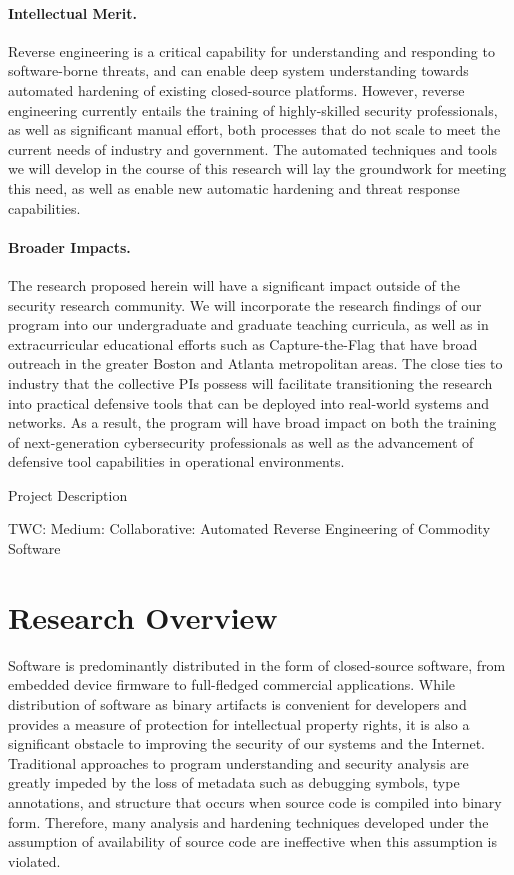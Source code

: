 \documentclass[letterpaper,twoside,11pt,headings=small]{scrartcl}
\newcommand{\basetitle}{TWC: Medium: Collaborative: Automated Reverse Engineering of Commodity Software}
\newcommand{\thetitle}{\basetitle\xspace}
\begin{document}
\paragraph{Intellectual Merit.} Reverse engineering is a critical capability
for understanding and responding to software-borne threats, and can enable
deep system understanding towards automated hardening of existing
closed-source platforms.  However, reverse engineering currently entails the
training of highly-skilled security professionals, as well as significant
manual effort, both processes that do not scale to meet the current needs of
industry and government.  The automated techniques and tools we will develop
in the course of this research will lay the groundwork for meeting this need,
as well as enable new automatic hardening and threat response capabilities.

\paragraph{Broader Impacts.} The research proposed herein will have a
significant impact outside of the security research community.  We will
incorporate the research findings of our program into our undergraduate and
graduate teaching curricula, as well as in extracurricular educational efforts
such as Capture-the-Flag that have broad outreach in the greater Boston and
Atlanta metropolitan areas.  The close ties to industry that the collective
PIs possess will facilitate transitioning the research into practical
defensive tools that can be deployed into real-world systems and networks. As
a result, the program will have broad impact on both the training of
next-generation cybersecurity professionals as well as the advancement of
defensive tool capabilities in operational environments.

\newpage
{}
\setcounter{page}{1}

{\sffamily\bfseries
\begin{center}
\fontsize{16}{16}\selectfont Project Description

\fontsize{13}{13}\selectfont \thetitle
\end{center}
}

\section{Research Overview}
\label{sec:overview}

Software is predominantly distributed in the form of closed-source software,
from embedded device firmware to full-fledged commercial applications.  While
distribution of software as binary artifacts is convenient for developers and
provides a measure of protection for intellectual property rights, it is also
a significant obstacle to improving the security of our systems and the
Internet.  Traditional approaches to program understanding and security
analysis are greatly impeded by the loss of metadata such as debugging
symbols, type annotations, and structure that occurs when source code is
compiled into binary form.  Therefore, many analysis and hardening techniques
developed under the assumption of availability of source code are ineffective
when this assumption is violated.
\end{document}
